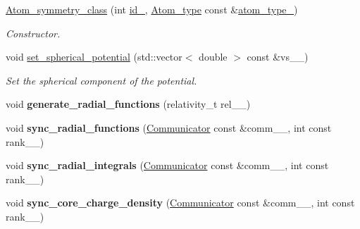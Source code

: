 \begin{DoxyCompactItemize}
\item 
\hyperlink{classsirius_1_1_atom__symmetry__class_a08eaf2331397fd9b3ef83d44ea77e57c}{Atom\+\_\+symmetry\+\_\+class} (int \hyperlink{classsirius_1_1_atom__symmetry__class_aa4c86581251ec529aed2437f1a370b30}{id\+\_\+}, \hyperlink{classsirius_1_1_atom__type}{Atom\+\_\+type} const \&\hyperlink{classsirius_1_1_atom__symmetry__class_a2668fe2a989f893e02a0bc1e5424e4ea}{atom\+\_\+type\+\_\+})
\begin{DoxyCompactList}\small\item\em Constructor. \end{DoxyCompactList}\item 
void \hyperlink{classsirius_1_1_atom__symmetry__class_a12117e8c6bca5886de9277fb2f94bfd2}{set\+\_\+spherical\+\_\+potential} (std\+::vector$<$ double $>$ const \&vs\+\_\+\+\_\+)
\begin{DoxyCompactList}\small\item\em Set the spherical component of the potential. \end{DoxyCompactList}\item 
\hypertarget{classsirius_1_1_atom__symmetry__class_a0720b11a330c18fbb110183d537044d1}{}void {\bfseries generate\+\_\+radial\+\_\+functions} (relativity\+\_\+t rel\+\_\+\+\_\+)\label{classsirius_1_1_atom__symmetry__class_a0720b11a330c18fbb110183d537044d1}

\item 
\hypertarget{classsirius_1_1_atom__symmetry__class_ac81d67adcd9da2015c6b29517d006168}{}void {\bfseries sync\+\_\+radial\+\_\+functions} (\hyperlink{classsddk_1_1_communicator}{Communicator} const \&comm\+\_\+\+\_\+, int const rank\+\_\+\+\_\+)\label{classsirius_1_1_atom__symmetry__class_ac81d67adcd9da2015c6b29517d006168}

\item 
\hypertarget{classsirius_1_1_atom__symmetry__class_a42dae3d52686f26f5e36a4b048382568}{}void {\bfseries sync\+\_\+radial\+\_\+integrals} (\hyperlink{classsddk_1_1_communicator}{Communicator} const \&comm\+\_\+\+\_\+, int const rank\+\_\+\+\_\+)\label{classsirius_1_1_atom__symmetry__class_a42dae3d52686f26f5e36a4b048382568}

\item 
\hypertarget{classsirius_1_1_atom__symmetry__class_ae5c5f365f42a8a75a06c7bcfa2466e3c}{}void {\bfseries sync\+\_\+core\+\_\+charge\+\_\+density} (\hyperlink{classsddk_1_1_communicator}{Communicator} const \&comm\+\_\+\+\_\+, int const rank\+\_\+\+\_\+)\label{classsirius_1_1_atom__symmetry__class_ae5c5f365f42a8a75a06c7bcfa2466e3c}


\end{DoxyCompactItemize}
